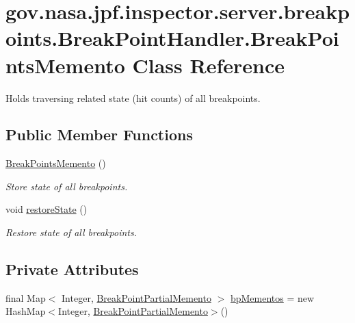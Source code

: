 \hypertarget{classgov_1_1nasa_1_1jpf_1_1inspector_1_1server_1_1breakpoints_1_1_break_point_handler_1_1_break_points_memento}{}\section{gov.\+nasa.\+jpf.\+inspector.\+server.\+breakpoints.\+Break\+Point\+Handler.\+Break\+Points\+Memento Class Reference}
\label{classgov_1_1nasa_1_1jpf_1_1inspector_1_1server_1_1breakpoints_1_1_break_point_handler_1_1_break_points_memento}


Holds traversing related state (hit counts) of all breakpoints.  


\subsection*{Public Member Functions}
\begin{DoxyCompactItemize}
\item 
\hyperlink{classgov_1_1nasa_1_1jpf_1_1inspector_1_1server_1_1breakpoints_1_1_break_point_handler_1_1_break_points_memento_ab56ed8ab5960c0e6970c33d7c94be0db}{Break\+Points\+Memento} ()
\begin{DoxyCompactList}\small\item\em Store state of all breakpoints. \end{DoxyCompactList}\item 
void \hyperlink{classgov_1_1nasa_1_1jpf_1_1inspector_1_1server_1_1breakpoints_1_1_break_point_handler_1_1_break_points_memento_a852de72fcddb81a40e5438cef82079eb}{restore\+State} ()
\begin{DoxyCompactList}\small\item\em Restore state of all breakpoints. \end{DoxyCompactList}\end{DoxyCompactItemize}
\subsection*{Private Attributes}
\begin{DoxyCompactItemize}
\item 
final Map$<$ Integer, \hyperlink{interfacegov_1_1nasa_1_1jpf_1_1inspector_1_1server_1_1breakpoints_1_1_break_point_handler_1_1_break_point_partial_memento}{Break\+Point\+Partial\+Memento} $>$ \hyperlink{classgov_1_1nasa_1_1jpf_1_1inspector_1_1server_1_1breakpoints_1_1_break_point_handler_1_1_break_points_memento_a2d6ba75868019239ae2cc84828be7950}{bp\+Mementos} = new Hash\+Map$<$Integer, \hyperlink{interfacegov_1_1nasa_1_1jpf_1_1inspector_1_1server_1_1breakpoints_1_1_break_point_handler_1_1_break_point_partial_memento}{Break\+Point\+Partial\+Memento}$>$()
\end{DoxyCompactItemize}


